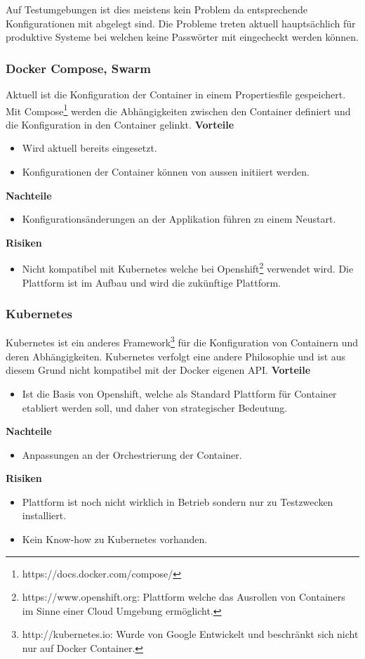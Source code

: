 Auf Testumgebungen ist dies meistens kein Problem da entsprechende Konfigurationen mit abgelegt sind. Die Probleme treten aktuell hauptsächlich für produktive Systeme bei welchen keine Passwörter mit eingecheckt werden können.

\subsubsection{Docker Compose, Swarm}

Aktuell ist die Konfiguration der Container in einem Propertiesfile gespeichert. Mit Compose\footnote{https://docs.docker.com/compose/} werden die Abhängigkeiten zwischen den Container definiert und die Konfiguration in den Container gelinkt.\newline
\newline
\textbf{Vorteile}
\begin{itemize}
	\item Wird aktuell bereits eingesetzt.
	\item Konfigurationen der Container können von aussen initiiert werden.
\end{itemize}
\textbf{Nachteile}
\begin{itemize}
	\item Konfigurationsänderungen an der Applikation führen zu einem Neustart.
\end{itemize}
\textbf{Risiken}
\begin{itemize}
	\item Nicht kompatibel mit Kubernetes welche bei Openshift\footnote{https://www.openshift.org: Plattform welche das Ausrollen von Containers im Sinne einer Cloud Umgebung ermöglicht.}  verwendet wird. Die Plattform ist im Aufbau und wird die zukünftige Plattform.
\end{itemize}

\subsubsection{Kubernetes}

Kubernetes ist ein anderes Framework\footnote{http://kubernetes.io: Wurde von Google Entwickelt und beschränkt sich nicht nur auf Docker Container.} für die Konfiguration von Containern und deren Abhängigkeiten. Kubernetes verfolgt eine andere Philosophie und ist aus diesem Grund nicht kompatibel mit der Docker eigenen API.
\textbf{Vorteile}
\begin{itemize}
	\item Ist die Basis von Openshift, welche als Standard Plattform für Container etabliert werden soll, und daher von strategischer Bedeutung.
\end{itemize}
\textbf{Nachteile}
\begin{itemize}
	\item Anpassungen an der Orchestrierung der Container.
\end{itemize}
\textbf{Risiken}
\begin{itemize}
	\item Plattform ist noch nicht wirklich in Betrieb sondern nur zu Testzwecken installiert.
	\item Kein Know-how zu Kubernetes vorhanden.
\end{itemize}

